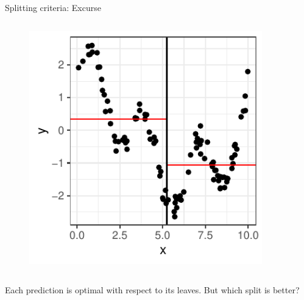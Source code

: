 \documentclass[11pt,compress,t,notes=noshow, xcolor=table]{beamer}
\begin{document}
\begin{vbframe}{Splitting criteria: Excurse}
\begin{columns}
\begin{column}{0.5\textwidth}
\begin{figure}
\includegraphics[width=0.9\textwidth]{figure/splitcrit_optimal-constant-sub2.pdf} 
\end{figure}

\end{column}
\end{columns}

Each prediction is optimal with respect to its leaves. But which split is better?

\end{vbframe}
\end{document}
